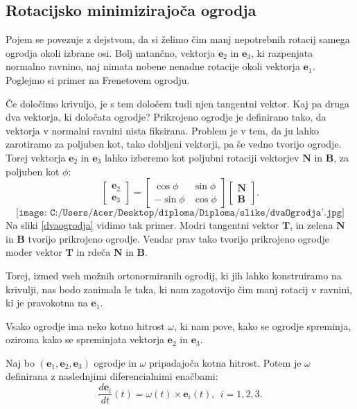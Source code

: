 \documentclass[mat1]{fmfdelo}
\newcommand{\e}{\boldsymbol e}
\newcommand{\TT}{\boldsymbol T}
\newcommand{\NN}{\boldsymbol N}
\newcommand{\BB}{\boldsymbol B}
\begin{document}
\subsection{Rotacijsko minimizirajoča ogrodja} Pojem se povezuje z dejstvom, da si želimo čim manj nepotrebnih rotacij samega ogrodja okoli izbrane osi. Bolj natančno, vektorja $\e_2$ in $\e_3$, ki razpenjata normalno ravnino, naj nimata nobene nenadne rotacije okoli vektorja $\e_1$. Poglejmo si primer na Frenetovem ogrodju.
\begin{primer}
	Če določimo krivuljo, je s tem določem tudi njen tangentni vektor. Kaj pa druga dva vektorja, ki določata ogrodje? Prikrojeno ogrodje je definirano tako, da vektorja v normalni ravnini nista fiksirana. Problem je v tem, da ju lahko zarotiramo za poljuben kot, tako dobljeni vektorji, pa še vedno tvorijo ogrodje. Torej vektorja $\e_2$ in $\e_3$ lahko izberemo kot poljubni rotaciji vektorjev $\NN$ in $\BB$, za poljuben kot $\phi$:
	\begin{equation*}
		\begin{bmatrix}
		\e_2 \\
		\e_3
		\end{bmatrix}
		=
		\begin{bmatrix}
		\cos \phi & \sin \phi \\
		-\sin \phi & \cos \phi
		\end{bmatrix}
		\begin{bmatrix}
		\NN \\ \BB
		\end{bmatrix}.
	\end{equation*}
\begin{equation*}
\texttt{[image: C:/Users/Acer/Desktop/diploma/Diploma/slike/dvaOgrodja'.jpg]}
\end{equation*}
Na sliki \ref{dvaogrodja} vidimo tak primer. Modri tangentni vektor $\TT$, in zelena $\NN$ in $\BB$ tvorijo prikrojeno ogrodje. Vendar prav tako tvorijo prikrojeno ogrodje moder vektor $\TT$ in rdeča $\NN$ in $\BB$.
\end{primer}
Torej, izmed vseh možnih ortonormiranih ogrodij, ki jih lahko konstruiramo na krivulji, nas bodo zanimala le taka, ki nam zagotovijo čim manj rotacij v ravnini, ki je pravokotna  na $\e_1$.
 
Vsako ogrodje ima neko kotno hitrost $\omega$, ki nam pove, kako se ogrodje spreminja, oziroma kako se spreminjata vektorja $\e_2$ in $\e_3$.
\begin{definicija}
Naj bo $(\e_1,\e_2,\e_3)$ ogrodje in $\omega$ pripadajoča kotna hitrost. Potem je $\omega$ definirana z naslednjimi diferencialnimi enačbami:
\begin{equation}
\frac{d\e_i}{dt}(t) = \omega(t) \times \e_i(t), ~~ i=1,2,3.
\end{equation}
\end{definicija}
\end{document}
